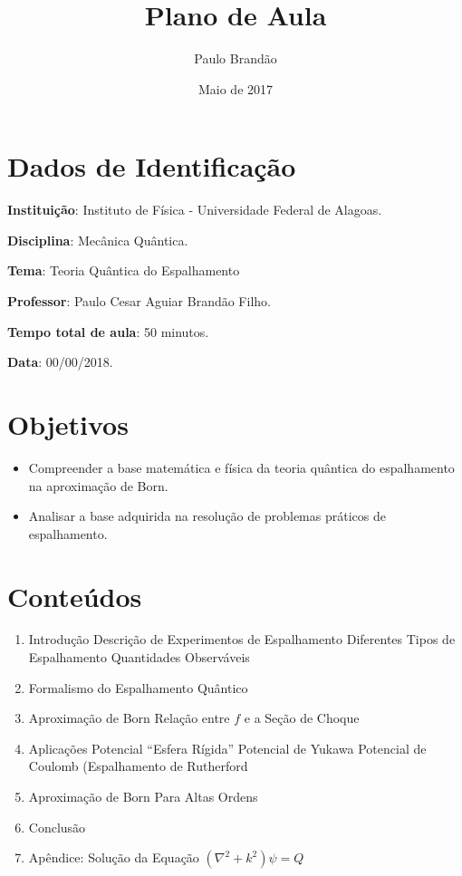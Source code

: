 \documentclass{article}
\title{\Huge\color{astral}\textbf{Plano de Aula}}
\author{Paulo Brandão}
\date{Maio de 2017}
\begin{document}
\maketitle

\section{Dados de Identificação}

\noindent \textbf{Instituição}: Instituto de Física - Universidade Federal de Alagoas.

\noindent \textbf{Disciplina}: Mecânica Quântica.

\noindent \textbf{Tema}: Teoria Quântica do Espalhamento

\noindent \textbf{Professor}: Paulo Cesar Aguiar Brandão Filho.

\noindent \textbf{Tempo total de aula}: 50 minutos.

\noindent \textbf{Data}: 00/00/2018.

\section{Objetivos}

\begin{itemize}
    \item Compreender a base matemática e física da teoria quântica do espalhamento na aproximação de Born.
    \item Analisar a base adquirida na resolução de problemas práticos de espalhamento.
\end{itemize}

\section{Conteúdos}

\begin{enumerate}
    \item Introdução
         Descrição de Experimentos de Espalhamento
         Diferentes Tipos de Espalhamento
         Quantidades Observáveis
    \item Formalismo do Espalhamento Quântico
    \item Aproximação de Born
         Relação entre $f$ e a Seção de Choque
    \item Aplicações
         Potencial ``Esfera Rígida''
         Potencial de Yukawa
         Potencial de Coulomb (Espalhamento de Rutherford
    \item Aproximação de Born Para Altas Ordens
    \item Conclusão
    \item Apêndice: Solução da Equação $(\nabla^2 + k^2)\psi = Q$
\end{enumerate}
\end{document}
